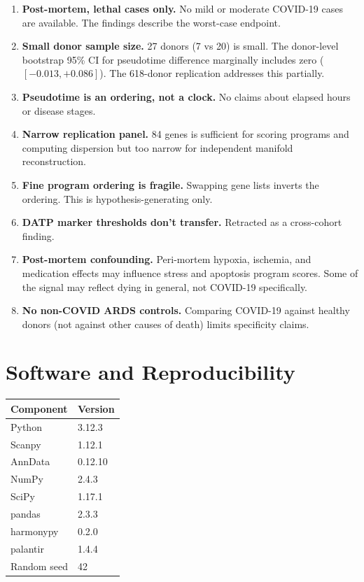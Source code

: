 \documentclass[11pt]{article}
\begin{document}
\begin{enumerate}
\item \textbf{Post-mortem, lethal cases only.} No mild or moderate COVID-19 cases are available. The findings describe the worst-case endpoint.
\item \textbf{Small donor sample size.} 27 donors (7 vs 20) is small. The donor-level bootstrap 95\% CI for pseudotime difference marginally includes zero ($[-0.013, +0.086]$). The 618-donor replication addresses this partially.
\item \textbf{Pseudotime is an ordering, not a clock.} No claims about elapsed hours or disease stages.
\item \textbf{Narrow replication panel.} 84 genes is sufficient for scoring programs and computing dispersion but too narrow for independent manifold reconstruction.
\item \textbf{Fine program ordering is fragile.} Swapping gene lists inverts the ordering. This is hypothesis-generating only.
\item \textbf{DATP marker thresholds don't transfer.} Retracted as a cross-cohort finding.
\item \textbf{Post-mortem confounding.} Peri-mortem hypoxia, ischemia, and medication effects may influence stress and apoptosis program scores. Some of the signal may reflect dying in general, not COVID-19 specifically.
\item \textbf{No non-COVID ARDS controls.} Comparing COVID-19 against healthy donors (not against other causes of death) limits specificity claims.
\end{enumerate}


\section{Software and Reproducibility}

\begin{center}
\small
\begin{tabular}{ll}
\toprule
Component & Version \\
\midrule
Python & 3.12.3 \\
Scanpy & 1.12.1 \\
AnnData & 0.12.10 \\
NumPy & 2.4.3 \\
SciPy & 1.17.1 \\
pandas & 2.3.3 \\
harmonypy & 0.2.0 \\
palantir & 1.4.4 \\
Random seed & 42 \\
\bottomrule
\end{tabular}
\end{center}
\end{document}
